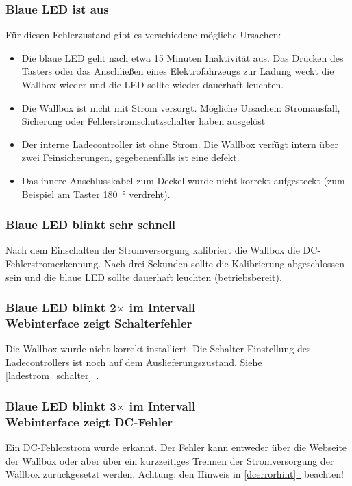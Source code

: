 \documentclass[a4paper,10pt]{article}
\newcommand*{\fullref}[1]{\hyperref[{#1}]{\ref*{#1}~\nameref*{#1}}}
\begin{document}
\begin{multicols*}{2}
	\subsubsection*{Blaue LED ist aus}
	Für diesen Fehlerzustand gibt es verschiedene mögliche Ursachen:
	\begin{itemize}
		\item Die blaue LED geht nach etwa 15 Minuten Inaktivität aus. Das Drücken des Tasters
		      oder das Anschließen eines Elektrofahrzeugs zur Ladung weckt die Wallbox wieder
		      und die LED sollte wieder dauerhaft leuchten.
		\item Die Wallbox ist nicht mit Strom versorgt. Mögliche Ursachen: Stromausfall,
		      Sicherung oder Fehlerstrom\-schutzschalter haben ausgelöst
		\item Der interne Ladecontroller ist ohne Strom. Die Wallbox verfügt intern über zwei
		      Feinsicherungen, gegebenenfalls ist eine defekt.
		\item Das innere Anschlusskabel zum Deckel wurde nicht korrekt aufgesteckt (zum Beispiel am Taster \SI{180}{\degree} verdreht).
	\end{itemize}

	\subsubsection*{Blaue LED blinkt sehr schnell}\label{fast_blink}
	Nach dem Einschalten der Stromversorgung kalibriert die Wallbox die
	DC-Fehlerstromerkennung. Nach drei Sekunden sollte die Kalibrierung
	abgeschlossen sein und die blaue LED sollte dauerhaft leuchten
	(betriebsbereit).

	\subsubsection*{Blaue LED blinkt 2$\times$ im Intervall \\ Webinterface zeigt Schalterfehler}
	Die Wallbox wurde nicht korrekt installiert. Die Schalter-Einstellung des Ladecontrollers ist
	noch auf dem Auslieferungszustand. Siehe \fullref{ladestrom_schalter}.

	\begin{minipage}{\linewidth} %
		\subsubsection*{Blaue LED blinkt 3$\times$ im Intervall \\ Webinterface zeigt DC-Fehler}
		Ein DC-Fehlerstrom wurde erkannt. Der Fehler kann entweder über die Webseite der Wallbox oder aber über
		ein kurzzeitiges Trennen der Stromversorgung der Wallbox zurückgesetzt
		werden. Achtung: den Hinweis in \fullref{dcerrorhint} beachten!
	\end{minipage}


\end{multicols*}
\end{document}
